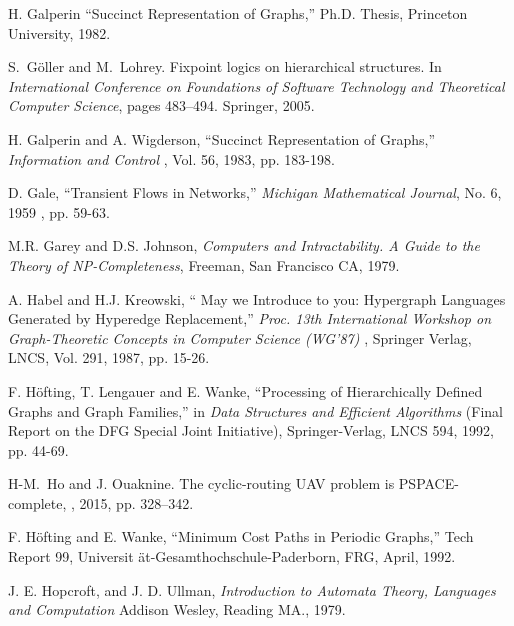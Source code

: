 \begin{thebibliography}{HMRR93}
 H. Galperin 
``Succinct Representation of Graphs,''
Ph.D. Thesis, Princeton University, 1982.


S.~G{\"o}ller and M.~Lohrey.
\newblock Fixpoint logics on hierarchical structures.
\newblock In {\em International Conference on Foundations of Software
  Technology and Theoretical Computer Science}, pages 483--494. Springer, 2005.



H. Galperin and A. Wigderson,
``Succinct Representation of Graphs,''
{\em Information and Control }, 
Vol. 56, 1983, pp. 183-198.






D. Gale,
``Transient Flows in Networks,''
{\em Michigan Mathematical Journal},
No. 6, 1959 , pp. 59-63.





M.R. Garey and  D.S. Johnson,
{\em Computers and Intractability. A Guide to the Theory of {NP}-Completeness},
Freeman, San Francisco CA, 1979.





A. Habel and H.J. Kreowski,
`` May we Introduce to you: Hypergraph Languages Generated by 
Hyperedge Replacement,'' 
{\em Proc. 13th International 
Workshop on Graph-Theoretic Concepts in Computer Science (WG'87) }, 
Springer Verlag, LNCS, Vol. 291, 1987, pp. 15-26.




F. H\"ofting, T. Lengauer and E. Wanke,
``Processing of Hierarchically Defined Graphs and 
Graph Families,'' in
{\em Data Structures and Efficient Algorithms}
(Final Report on the DFG Special Joint Initiative),
Springer-Verlag, LNCS 594, 1992, pp. 44-69.

H-M.~Ho and J.  Ouaknine. 
\newblock The cyclic-routing UAV problem is {PSPACE}-complete,
, 2015, pp. 328--342.

F. H\"ofting and E. Wanke,
``Minimum Cost Paths in Periodic  Graphs,''
Tech Report 99, Universit \"at-Gesamthochschule-Paderborn, FRG,  
April, 1992. 



J. E. Hopcroft, and J. D. Ullman,
{\em Introduction to Automata Theory, Languages and Computation}
Addison Wesley, Reading MA., 1979.





\end{thebibliography}
